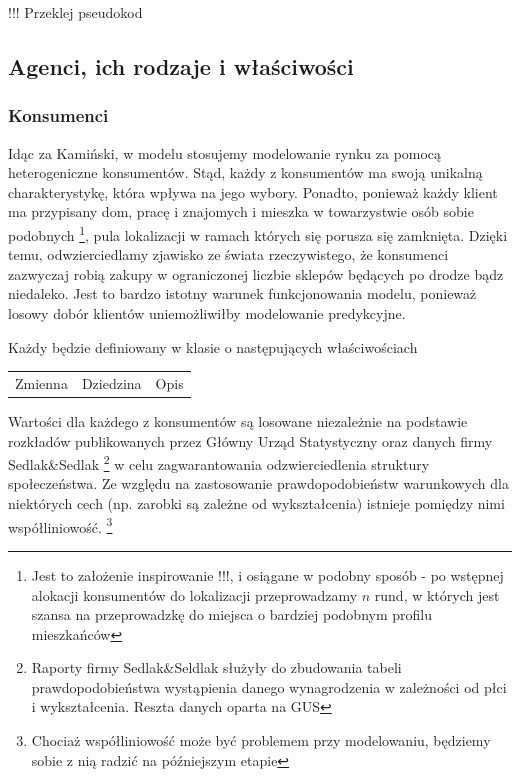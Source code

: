\documentclass{article}
\begin{document}
!!! Przeklej pseudokod

\subsection{Agenci, ich rodzaje i właściwości}
\subsubsection{Konsumenci} 

Idąc za Kamiński, w modelu stosujemy modelowanie rynku za pomocą heterogeniczne konsumentów. Stąd, każdy z konsumentów ma swoją unikalną charakterystykę, która wpływa na jego wybory. Ponadto, ponieważ każdy klient ma przypisany dom, pracę i znajomych i mieszka w towarzystwie osób sobie podobnych  \footnote{Jest to założenie inspirowanie !!!, i osiągane w podobny sposób - po wstępnej alokacji konsumentów do lokalizacji przeprowadzamy $n$ rund, w których jest szansa na przeprowadzkę do miejsca o bardziej podobnym profilu mieszkańców}, pula lokalizacji w ramach których się porusza się zamknięta. Dzięki temu, odwzierciedlamy zjawisko ze świata rzeczywistego, że konsumenci zazwyczaj robią zakupy w ograniczonej liczbie sklepów będących po drodze bądz niedaleko. Jest to bardzo istotny warunek funkcjonowania modelu, ponieważ losowy dobór klientów uniemożliwiłby modelowanie predykcyjne.

Każdy będzie definiowany w klasie o następujących właściwościach 

\begin{center}
\begin{tabular}{ c c c }
Zmienna & Dziedzina & Opis \\ 
\end{tabular}
\end{center}

Wartości dla każdego z konsumentów są losowane niezależnie na podstawie rozkładów publikowanych przez Główny Urząd Statystyczny oraz danych firmy Sedlak\&Sedlak \footnote{Raporty firmy Sedlak\&Seldlak służyły do zbudowania tabeli prawdopodobieństwa wystąpienia danego wynagrodzenia w zależności od płci i wykształcenia. Reszta danych oparta na GUS} w celu zagwarantowania odzwierciedlenia struktury społeczeństwa. Ze względu na zastosowanie prawdopodobieństw warunkowych dla niektórych cech (np. zarobki są zależne od wykształcenia) istnieje pomiędzy nimi współliniowość. \footnote{Chociaż współliniowość może być problemem przy modelowaniu, będziemy sobie z nią radzić na późniejszym etapie}
\end{document}
